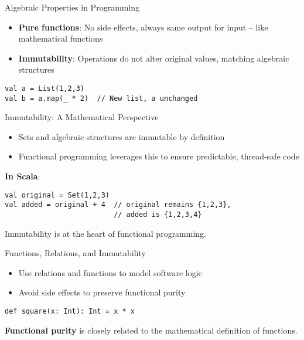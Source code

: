 \documentclass{beamer}
\begin{document}
\begin{frame}{Algebraic Properties in Programming}
\begin{itemize}
    \item \textbf{Pure functions}: No side effects, always same output for input – like mathematical functions
    \item \textbf{Immutability}: Operations do not alter original values, matching algebraic structures
\end{itemize}

\begin{lstlisting}
val a = List(1,2,3)
val b = a.map(_ * 2)  // New list, a unchanged
\end{lstlisting}
\end{frame}

\begin{frame}{Immutability: A Mathematical Perspective}
\begin{itemize}
    \item Sets and algebraic structures are immutable by definition
    \item Functional programming leverages this to ensure predictable, thread-safe code
\end{itemize}

\textbf{In Scala}:
\begin{lstlisting}
val original = Set(1,2,3)
val added = original + 4  // original remains {1,2,3}, 
                          // added is {1,2,3,4}
\end{lstlisting}

Immutability is at the heart of functional programming.
\end{frame}

\begin{frame}{Functions, Relations, and Immutability}
\begin{itemize}
    \item Use relations and functions to model software logic
    \item Avoid side effects to preserve functional purity
\end{itemize}

\begin{lstlisting}
def square(x: Int): Int = x * x
\end{lstlisting}

\textbf{Functional purity} is closely related to the mathematical definition of functions.
\end{frame}
\end{document}
